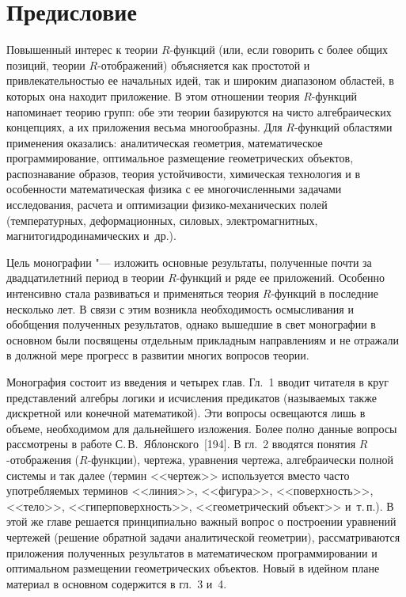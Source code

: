 \chapter*{Предисловие}

Повышенный интерес к теории $R$-функций (или, если говорить с более общих
позиций, теории $R$-отображений) объясняется как простотой и привлекательностью
ее начальных идей, так и широким диапазоном областей, в которых она находит
приложение. В этом отношении теория $R$-функций напоминает теорию групп: обе
эти теории базируются на чисто алгебраических концепциях, а их приложения
весьма многообразны. Для $R$-функций областями применения оказались:
аналитическая геометрия, математическое программирование, оптимальное
размещение геометрических объектов, распознавание образов, теория
устойчивости, химическая технология и в особенности математическая физика
с ее многочисленными задачами исследования, расчета и оптимизации
физико-механических полей (температурных, деформационных, силовых,
электромагнитных, магнитогидродинамических и~др.).

Цель монографии "--- изложить основные результаты, полученные почти за
двадцатилетний период в теории $R$-функций и ряде ее приложений. Особенно
интенсивно стала развиваться и применяться теория $R$-функций в последние
несколько лет. В связи с этим возникла необходимость осмысливания и обобщения
полученных результатов, однако вышедшие в свет монографии в основном были
посвящены отдельным прикладным направлениям и не отражали в должной мере
прогресс в развитии многих вопросов теории.

Монография состоит из введения и четырех глав. Гл.~1 вводит читателя в круг
представлений алгебры логики и исчисления предикатов (называемых также
дискретной или конечной математикой). Эти вопросы освещаются лишь в объеме,
необходимом для дальнейшего изложения. Более полно данные вопросы рассмотрены
в работе С.\,В.~Яблонского~[194]. В гл.~2 вводятся понятия $R$-отображения
($R$-функции), чертежа, уравнения чертежа, алгебраически полной системы и так
далее (термин <<чертеж>> используется вместо часто употребляемых терминов
<<линия>>, <<фигура>>, <<поверхность>>, <<тело>>, <<гиперповерхность>>,
<<геометрический объект>> и~т.\,п.). В этой же главе решается принципиально
важный вопрос о построении уравнений чертежей (решение обратной задачи
аналитической геометрии), рассматриваются приложения полученных результатов
в математическом программировании и оптимальном размещении геометрических
объектов. Новый в идейном плане материал в основном содержится в гл.~3 и~4.


